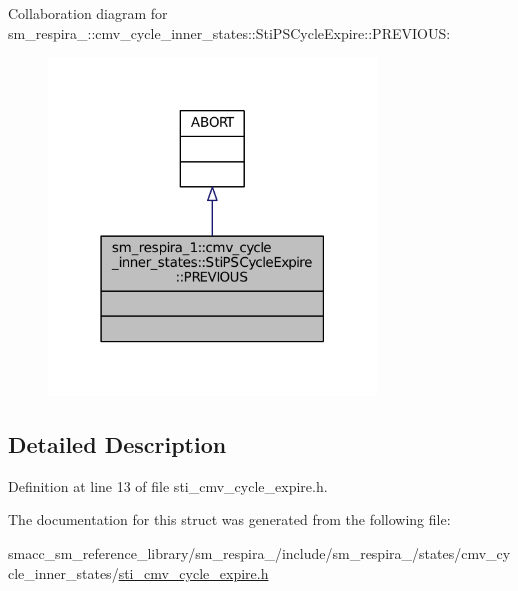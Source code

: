 Collaboration diagram for sm\+\_\+respira\+\_\+:\+:cmv\+\_\+cycle\+\_\+inner\+\_\+states\+:\+:Sti\+P\+S\+Cycle\+Expire\+:\+:P\+R\+E\+V\+I\+O\+US\+:
\nopagebreak
\begin{figure}[H]
\begin{center}
\leavevmode
\includegraphics[width=247pt]{structsm__respira__1_1_1cmv__cycle__inner__states_1_1StiPSCycleExpire_1_1PREVIOUS__coll__graph}
\end{center}
\end{figure}


\subsection{Detailed Description}


Definition at line 13 of file sti\+\_\+cmv\+\_\+cycle\+\_\+expire.\+h.



The documentation for this struct was generated from the following file\+:\begin{DoxyCompactItemize}
\item 
smacc\+\_\+sm\+\_\+reference\+\_\+library/sm\+\_\+respira\+\_/include/sm\+\_\+respira\+\_/states/cmv\+\_\+cycle\+\_\+inner\+\_\+states/\hyperlink{sti__cmv__cycle__expire_8h}{sti\+\_\+cmv\+\_\+cycle\+\_\+expire.\+h}\end{DoxyCompactItemize}
